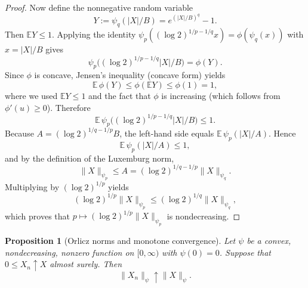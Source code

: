 \documentclass[12pt]{article}
\renewcommand{\(}{\left(}%
\renewcommand{\)}{\right)}%
\renewcommand{\[}{\left[}%
\renewcommand{\]}{\right]}%
\newtheorem{proposition}{Proposition}[section]}
\newtheorem{proof}{Proof.}}
\begin{document}
\begin{proof}
Now define the nonnegative random variable
\begin{equation*}
Y:=\psi_q(|X|/B)=e^{(|X|/B)^q}-1.
\end{equation*}
Then $\mathbb{E}Y\le 1$. Applying the identity $\psi_p((\log 2)^{1/p-1/q}x)=\phi(\psi_q(x))$ with $x=|X|/B$ gives
\begin{equation*}
\psi_p\big((\log 2)^{1/p-1/q}|X|/B\big)=\phi(Y).
\end{equation*}
Since $\phi$ is concave, Jensen's inequality (concave form) yields
\begin{equation*}
\mathbb{E}\,\phi(Y)\le \phi(\mathbb{E}Y)\le \phi(1)=1,
\end{equation*}
where we used $\mathbb{E}Y\le 1$ and the fact that $\phi$ is increasing (which follows from $\phi'(u)\ge 0$).
Therefore
\begin{equation*}
\mathbb{E}\,\psi_p\big((\log 2)^{1/p-1/q}|X|/B\big)\le 1.
\end{equation*}
Because $A=(\log 2)^{1/q-1/p}B$, the left-hand side equals $\mathbb{E}\,\psi_p(|X|/A)$. Hence
\begin{equation*}
\mathbb{E}\,\psi_p(|X|/A)\le 1,
\end{equation*}
and by the definition of the Luxemburg norm,
\begin{equation*}
\|X\|_{\psi_p}\le A=(\log 2)^{1/q-1/p}\|X\|_{\psi_q}.
\end{equation*}
Multiplying by $(\log 2)^{1/p}$ yields
\begin{equation*}
(\log 2)^{1/p}\|X\|_{\psi_p}\le (\log 2)^{1/q}\|X\|_{\psi_q},
\end{equation*}
which proves that $p\mapsto (\log 2)^{1/p}\|X\|_{\psi_p}$ is nondecreasing.
\end{proof}

\begin{proposition}[Orlicz norms and monotone convergence]
Let $\psi$ be a convex, nondecreasing, nonzero function on $[0,\infty)$ with
$\psi(0)=0$. Suppose that $0 \le X_n \uparrow X$ almost surely. Then
\begin{equation*}
	\|X_n\|_\psi \uparrow \|X\|_\psi .
\end{equation*}
\end{proposition}
\end{document}
